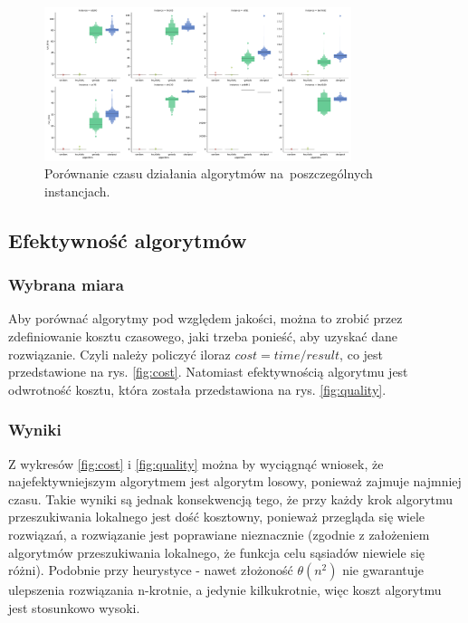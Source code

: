\begin{figure}
\begin{center}
\includegraphics[width=0.8\textwidth]{graphs/time_comparison_letval.pdf}
\end{center}
\caption{Porównanie czasu działania algorytmów na~poszczególnych instancjach.}
\label{fig:time}
\end{figure}

\subsection{Efektywność algorytmów}

\subsubsection{Wybrana miara}

Aby porównać algorytmy pod względem jakości, można to zrobić przez zdefiniowanie kosztu czasowego, jaki trzeba ponieść, aby uzyskać dane rozwiązanie. Czyli należy policzyć iloraz $cost = time / result$, co jest przedstawione na rys. \ref{fig:cost}. Natomiast efektywnością algorytmu jest odwrotność kosztu, która została przedstawiona na rys. \ref{fig:quality}.

\subsubsection{Wyniki}

Z wykresów \ref{fig:cost} i \ref{fig:quality} można by wyciągnąć wniosek, że najefektywniejszym algorytmem jest algorytm losowy, ponieważ zajmuje najmniej czasu. Takie wyniki są jednak konsekwencją tego, że przy każdy krok algorytmu przeszukiwania lokalnego jest dość kosztowny, ponieważ przegląda się wiele rozwiązań, a rozwiązanie jest poprawiane nieznacznie (zgodnie z założeniem algorytmów przeszukiwania lokalnego, że funkcja celu sąsiadów niewiele się różni). Podobnie przy heurystyce - nawet złożoność $\theta(n^2)$ nie gwarantuje ulepszenia rozwiązania n-krotnie, a jedynie kilkukrotnie, więc koszt algorytmu jest stosunkowo wysoki.

